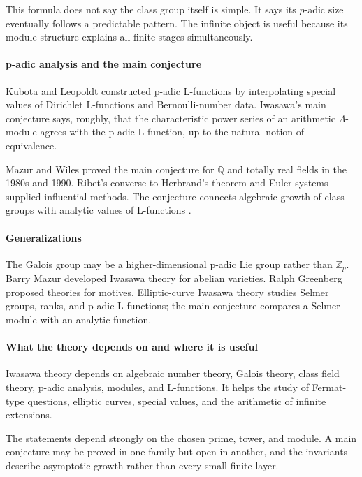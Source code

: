 This formula does not say the class group itself is simple. It says its $p$-adic size eventually follows a predictable pattern. The infinite object is useful because its module structure explains all finite stages simultaneously.

\paragraph{p-adic analysis and the main conjecture}
Kubota and Leopoldt constructed p-adic L-functions by interpolating special values of Dirichlet L-functions and Bernoulli-number data. Iwasawa's main conjecture says, roughly, that the characteristic power series of an arithmetic $\Lambda$-module agrees with the p-adic L-function, up to the natural notion of equivalence.

Mazur and Wiles proved the main conjecture for $\mathbb Q$ and totally real fields in the 1980s and 1990. Ribet's converse to Herbrand's theorem and Euler systems supplied influential methods. The conjecture connects algebraic growth of class groups with analytic values of L-functions \cite{iwasawa_theory_ref3}.

\paragraph{Generalizations}
The Galois group may be a higher-dimensional p-adic Lie group rather than $\mathbb Z_p$. Barry Mazur developed Iwasawa theory for abelian varieties. Ralph Greenberg proposed theories for motives. Elliptic-curve Iwasawa theory studies Selmer groups, ranks, and p-adic L-functions; the main conjecture compares a Selmer module with an analytic function.

\paragraph{What the theory depends on and where it is useful}
Iwasawa theory depends on algebraic number theory, Galois theory, class field theory, p-adic analysis, modules, and L-functions. It helps the study of Fermat-type questions, elliptic curves, special values, and the arithmetic of infinite extensions.

The statements depend strongly on the chosen prime, tower, and module. A main conjecture may be proved in one family but open in another, and the invariants describe asymptotic growth rather than every small finite layer.

